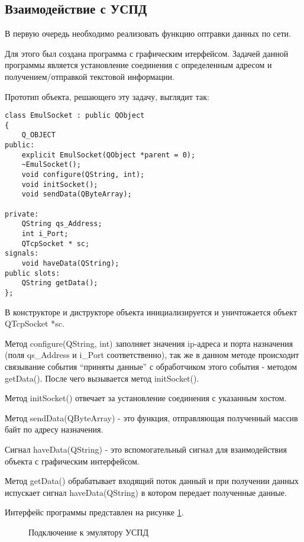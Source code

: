 \subsection{Взаимодействие с УСПД}

В первую очередь необходимо реализовать функцию оптравки данных по сети. 

Для этого был создана программа с графическим итерфейсом. Задачей данной программы является установление соединения с определенным адресом и получением/отправкой текстовой информации.

Прототип объекта, решающего эту задачу, выглядит так:

\begin{lstlisting}
class EmulSocket : public QObject
{
    Q_OBJECT
public:
    explicit EmulSocket(QObject *parent = 0);
    ~EmulSocket();
    void configure(QString, int);
    void initSocket();
    void sendData(QByteArray);

private:
    QString qs_Address;
    int i_Port;
    QTcpSocket * sc;
signals:
    void haveData(QString);
public slots:
    QString getData();
};
\end{lstlisting}

В конструкторе и диструкторе объекта инициализируется и уничтожается объект QTcpSocket *sc.

Метод configure(QString, int) заполняет значения ip-адреса и порта назначения (поля qs\_Address и i\_Port соответственно), так же в данном методе происходит связывание события ``приняты данные'' с обработчиком этого события - методом getData(). После чего вызывается метод initSocket().

Метод initSocket() отвечает за установление соединения с указанным хостом.

Метод sendData(QByteArray) - это функция, отправляющая полученный массив байт по адресу назначения.

Сигнал haveData(QString) - это вспомогательный сигнал для взаимодействия объекта с графическим интерфейсом.

Метод getData() обрабатывает входящий поток данный и при получении данных испускает сигнал haveData(QString) в котором передает полученные данные.

Интерфейс программы представлен на рисунке \ref{window1:window1}.

\begin{figure}[h!]
 \caption{Подключение к эмулятору УСПД}
 \label{window1:window1}
\end{figure}

